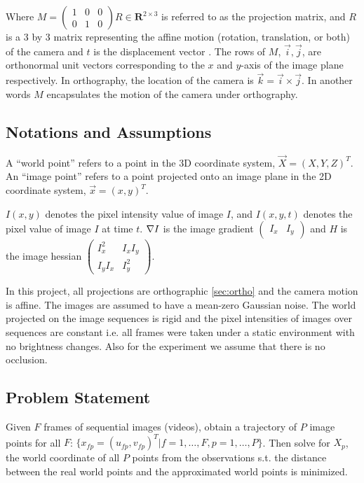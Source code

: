 Where $M = \begin{pmatrix}
  1& 0&0 \\0 & 1 & 0
\end{pmatrix}R \in \mathbf{R}^{2\times 3}$ is referred to as the projection matrix, and $R$
is a 3 by 3 matrix representing the affine motion (rotation, translation, or
both) of the camera and $t$ is the displacement vector
\cite[p.172]{AZ}. The rows of $M$, $\vec i, \vec j$, are orthonormal unit vectors
corresponding to the $x$ and $y$-axis of the image plane respectively. In
orthography, the location of the camera is $\vec k = \vec i \times
\vec j$. In another words $M$ encapsulates the motion of the
camera under orthography. 

\subsection{Notations and Assumptions}
\label{sec:notations}
A ``world point'' refers to a point in the 3D
coordinate system, $\vec X = (X,Y,Z)^T$. An ``image point'' refers
to a point projected onto an image plane in the 2D coordinate system,
$\vec x =(x,y)^T$. 

$I(x,y)$ denotes the pixel intensity value of image $I$, and $I(x,y,t)$ denotes the
pixel value of image $I$ at time $t$. $\nabla I$ is the image gradient
$\begin{pmatrix}
I_x & I_y  
\end{pmatrix}$ and $H$ is the image hessian $\begin{pmatrix}  I_x^2
  & I_xI_y \\ I_yI_x & I_y^2\end{pmatrix}$.

In this project, all projections are orthographic \ref{sec:ortho}
and the camera motion is affine. The images are assumed to have a mean-zero Gaussian noise. The world projected on the image
sequences is rigid and the pixel intensities of images over sequences are
constant i.e. all frames were taken under a static environment with no
brightness changes. Also for the experiment we assume that there is
no occlusion.

\subsection{Problem Statement}
\label{sec:problem-statement}
Given $F$ frames of sequential images (videos), obtain a trajectory
of $P$ image points for all $F$: $\{x_{fp} = (u_{fp}, v_{fp})^T
|f=1,\dots,F, p=1,\dots,P\}$. Then solve for $X_{p}$, the world
coordinate of all $P$ points from the observations s.t. the distance
between the real world points and the approximated world points is
minimized.

